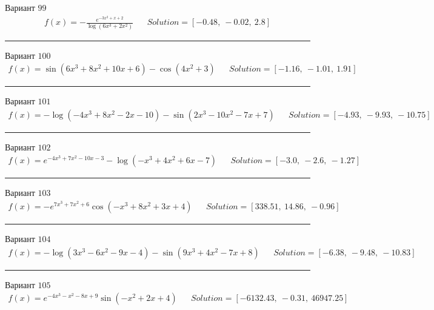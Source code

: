 \documentclass[11pt]{report}
\begin{document}
Вариант \(99\)
\begin{align*}
    f(x) = - \frac{e^{- 3 x^{2} + x + 2}}{\log{\left(6 x^{3} + 2 x^{2} \right)}} && Solution = \left[ -0.48, \  -0.02, \  2.8\right]
\end{align*}
\begin{center}
    \noindent\rule{8cm}{0.4pt}
\end{center}
Вариант \(100\)
\begin{align*}
    f(x) = \sin{\left(6 x^{3} + 8 x^{2} + 10 x + 6 \right)} - \cos{\left(4 x^{2} + 3 \right)} && Solution = \left[ -1.16, \  -1.01, \  1.91\right]
\end{align*}
\begin{center}
    \noindent\rule{8cm}{0.4pt}
\end{center}
Вариант \(101\)
\begin{align*}
    f(x) = - \log{\left(- 4 x^{3} + 8 x^{2} - 2 x - 10 \right)} - \sin{\left(2 x^{3} - 10 x^{2} - 7 x + 7 \right)} && Solution = \left[ -4.93, \  -9.93, \  -10.75\right]
\end{align*}
\begin{center}
    \noindent\rule{8cm}{0.4pt}
\end{center}
Вариант \(102\)
\begin{align*}
    f(x) = e^{- 4 x^{3} + 7 x^{2} - 10 x - 3} - \log{\left(- x^{3} + 4 x^{2} + 6 x - 7 \right)} && Solution = \left[ -3.0, \  -2.6, \  -1.27\right]
\end{align*}
\begin{center}
    \noindent\rule{8cm}{0.4pt}
\end{center}
Вариант \(103\)
\begin{align*}
    f(x) = - e^{7 x^{3} + 7 x^{2} + 6} \cos{\left(- x^{3} + 8 x^{2} + 3 x + 4 \right)} && Solution = \left[ 338.51, \  14.86, \  -0.96\right]
\end{align*}
\begin{center}
    \noindent\rule{8cm}{0.4pt}
\end{center}
Вариант \(104\)
\begin{align*}
    f(x) = - \log{\left(3 x^{3} - 6 x^{2} - 9 x - 4 \right)} - \sin{\left(9 x^{3} + 4 x^{2} - 7 x + 8 \right)} && Solution = \left[ -6.38, \  -9.48, \  -10.83\right]
\end{align*}
\begin{center}
    \noindent\rule{8cm}{0.4pt}
\end{center}
Вариант \(105\)
\begin{align*}
    f(x) = e^{- 4 x^{3} - x^{2} - 8 x + 9} \sin{\left(- x^{2} + 2 x + 4 \right)} && Solution = \left[ -6132.43, \  -0.31, \  46947.25\right]
\end{align*}
\end{document}
